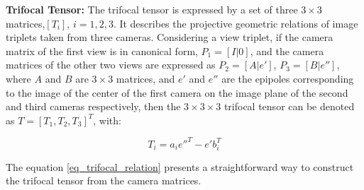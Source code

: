 \textbf{Trifocal Tensor:} The trifocal tensor is expressed by a set of three $ 3 \times 3$ matrices,$[T_i]$, $i=1,2,3$. It describes the projective geometric relations of image triplets taken from three cameras. Considering a view triplet, if the camera matrix of the first view is in canonical form, $P_1 = [I|0]$, and the camera matrices of the other two views are expressed as $P_2 = [A|e']$, $P_3 = [B|e'']$, where $A$ and $B$ are $3 \times 3$ matrices, and $e'$ and $e''$ are the epipoles corresponding to the image of the center of the first camera on the image plane of the second and third cameras respectively, then the $3\times3\times3$ trifocal tensor
can be denoted as $T  = [T_1,T_2,T_3] ^ T$, with:

\begin{equation}
	T_i = a_ie''^T - e'b_i^T 
\label{eq_trifocal_relation}
\end{equation}

The equation \ref{eq_trifocal_relation} presents a straightforward way to construct the trifocal tensor from the camera matrices.
\newpage

